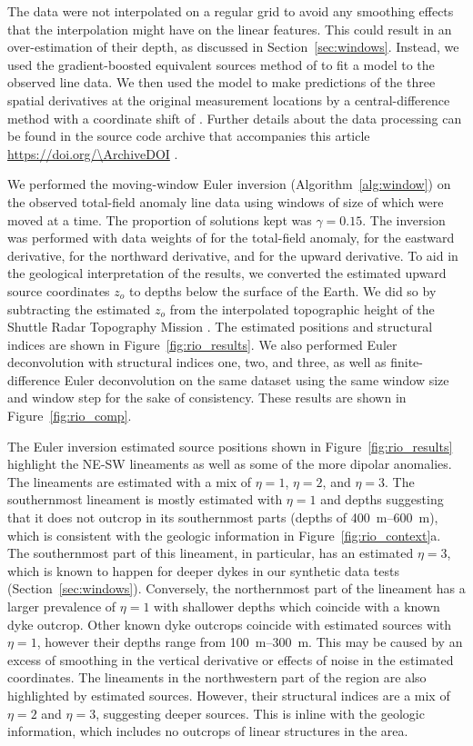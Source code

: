 The data were not interpolated on a regular grid to avoid any smoothing effects that the interpolation might have on the linear features.
This could result in an over-estimation of their depth, as discussed in Section~\ref{sec:windows}.
Instead, we used the gradient-boosted equivalent sources method of \citet{Soler2021} to fit a model to the observed line data.
We then used the model to make predictions of the three spatial derivatives at the original measurement locations by a central-difference method with a coordinate shift of \RioDerivSpacing{}.
Further details about the data processing can be found in the source code archive that accompanies this article \url{https://doi.org/\ArchiveDOI} \citep{figshare}.

We performed the moving-window Euler inversion (Algorithm~\ref{alg:window}) on the observed total-field anomaly line data using windows of size of \RioWindowSize{} which were moved \RioWindowStep{} at a time.
The proportion of solutions kept was $\gamma=0.15$.
The inversion was performed with data weights of \RioWeightsF{} for the total-field anomaly, \RioWeightsE{} for the eastward derivative, \RioWeightsN{} for the northward derivative, and \RioWeightsU{} for the upward derivative.
To aid in the geological interpretation of the results, we converted the estimated upward source coordinates $z_o$ to depths below the surface of the Earth.
We did so by subtracting the estimated $z_o$ from the interpolated topographic height of the Shuttle Radar Topography Mission \citep[SRTM;][]{SRTM}.
The estimated positions and structural indices are shown in Figure~\ref{fig:rio_results}.
We also performed Euler deconvolution with structural indices one, two, and
three, as well as finite-difference Euler deconvolution on the same dataset
using the same window size and window step for the sake of consistency.
These results are shown in Figure~\ref{fig:rio_comp}.

The Euler inversion estimated source positions shown in Figure~\ref{fig:rio_results} highlight the NE-SW lineaments as well as some of the more dipolar anomalies.
The lineaments are estimated with a mix of $\eta=1$, $\eta=2$, and $\eta=3$.
The southernmost lineament is mostly estimated with $\eta=1$ and depths suggesting that it does not outcrop in its southernmost parts (depths of \qtyrange{400}{600}{\m}), which is consistent with the geologic information in Figure~\ref{fig:rio_context}a.
The southernmost part of this lineament, in particular, has an estimated $\eta=3$, which is known to happen for deeper dykes in our synthetic data tests (Section~\ref{sec:windows}).
Conversely, the northernmost part of the lineament has a larger prevalence of $\eta=1$ with shallower depths which coincide with a known dyke outcrop.
Other known dyke outcrops coincide with estimated sources with $\eta=1$, however their depths range from \qtyrange{100}{300}{\m}.
This may be caused by an excess of smoothing in the vertical derivative or effects of noise in the estimated coordinates.
The lineaments in the northwestern part of the region are also highlighted by estimated sources.
However, their structural indices are a mix of $\eta=2$ and $\eta=3$, suggesting deeper sources.
This is inline with the geologic information, which includes no outcrops of linear structures in the area.

